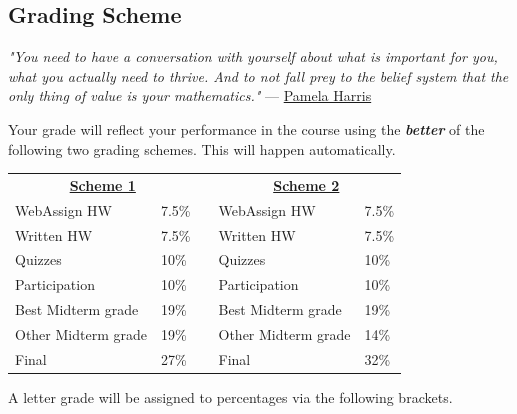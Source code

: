 \documentclass[11pt]{article}
\begin{document}
\newpage

\subsection{Grading Scheme} \label{gradingscheme}

\begin{center}
    \textit{"You need to have a conversation with yourself about what is important for you, what you actually need to thrive. And to not fall prey to the belief system that the only thing of value is your mathematics."} --- \href{https://www.pamelaeharris.com/}{Pamela Harris}
\end{center}


Your grade will reflect your performance in the course using the \emph{\textbf{better}} of the following two grading schemes. This will happen automatically. 

\begin{center}
    \begin{minipage}[t]{.95\textwidth}
\begin{center}
\begin{tabular}{llcll}
\multicolumn{2}{c}{\underline{\textbf{Scheme 1}}} & \multicolumn{1}{c}{} & \multicolumn{2}{c}{\underline{\textbf{Scheme 2}}}\\
WebAssign HW & 7.5\%  &  \qquad & WebAssign HW & 7.5\%\\
Written HW & 7.5\%  &  \qquad & Written HW & 7.5\%\\
Quizzes & 10\%  &  \qquad & Quizzes & 10\%\\
Participation & 10\%  &  \qquad    &Participation & 10\%\\
Best Midterm grade & 19\%  & \qquad    & Best Midterm grade & 19\% \\
Other Midterm grade & 19\% &   \qquad    & Other Midterm grade & 14\% \\
Final & 27\%  &   \qquad   & Final & 32\%
\end{tabular}
\end{center}
\end{minipage}
\end{center}

A letter grade will be assigned to percentages via the following brackets.
\end{document}
